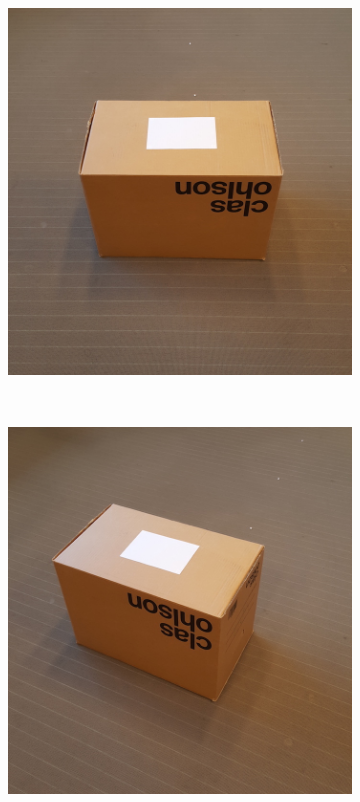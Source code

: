 \begin{figure}
	\centering
	\begin{subfigure}[b]{0.2\textwidth}
		\includegraphics[width=\textwidth]{figures/angle_1.jpg}
		\label{fig:angle_1}
	\end{subfigure}
	~
	\begin{subfigure}[b]{0.2\textwidth}
		\includegraphics[width=\textwidth]{figures/angle_2.jpg}

\end{subfigure}
\end{figure}
